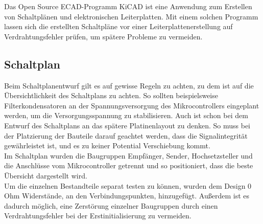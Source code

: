 
Das Open Source ECAD-Programm KiCAD ist eine Anwendung zum Erstellen von Schaltplänen und elektronischen Leiterplatten. Mit einem solchen Programm lassen sich die erstellten Schaltpläne vor einer Leiterplattenerstellung auf Verdrahtungsfehler prüfen, um spätere Probleme zu vermeiden.

\subsection{Schaltplan}
Beim Schaltplanentwurf gilt es auf gewisse Regeln zu achten, zu dem ist auf die Übersichtlichkeit des Schaltplans zu achten.
So sollten beispielsweise Filterkondensatoren an der Spannungsversorgung des Mikrocontrollers eingeplant werden, um die Versorgungsspannung zu stabilisieren. Auch ist schon bei dem Entwurf des Schaltplans an das spätere Platinenlayout zu denken. So muss bei der Platzierung der Bauteile darauf geachtet werden, dass die Signalintegrität gewährleistet ist, und es zu keiner Potential Verschiebung kommt.\\
Im Schaltplan wurden die Baugruppen Empfänger, Sender, Hochsetzsteller und die Anschlüsse vom Mikrocontroller getrennt und so positioniert, dass die beste Übersicht dargestellt wird.\\
Um die einzelnen Bestandteile separat testen zu können, wurden dem Design 0\,Ohm Widerstände, an den Verbindungspunkten, hinzugefügt. Außerdem ist es dadurch möglich, eine Zerstörung einzelner Baugruppen durch einen Verdrahtungsfehler bei der Erstinitialisierung zu vermeiden.\\   
\newpage
